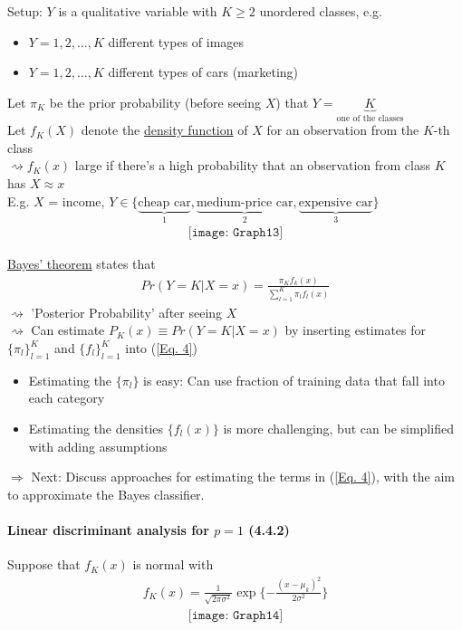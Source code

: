 \documentclass[11pt,a4paper,numbers=endperiod]{scrartcl}
\begin{document}
{Setup: $Y$ is a qualitative variable with $K \geq 2$ unordered classes, e.g. \begin{itemize}
	\item $Y = 1, 2, \ldots, K$ different types of images
	\item $Y = 1, 2, \ldots, K$ different types of cars (marketing) 
\end{itemize}
Let $\pi_K$ be the prior probability (before seeing $X$) that $Y = \underbrace{K}_{\text{one of the classes}}$\\
Let $f_K(X)$ denote the \underline{density function} of $X$ for an observation from the $K$-th class\\
$\rightsquigarrow f_K(x)$ large if there's a high probability that an observation from class $K$ has $X \approx x$\\ 
E.g. $X$ = income, $Y \in \{\underbrace{\text{cheap car}}_1, \underbrace{\text{medium-price car}}_2, \underbrace{\text{expensive car}}_3\}$
\begin{align*}
	\texttt{[image: Graph13]}
\end{align*}
	
\underline{Bayes' theorem} states that \begin{align}
	Pr(Y = K| X = x) = \frac{\pi_K f_k(x)}{\sum\limits_{l = 1}^K \pi_l f_l(x)}  \label{Eq. 4}
\end{align}	
$\rightsquigarrow$ 'Posterior Probability' after seeing $X$\\
$\rightsquigarrow$ Can estimate $P_K(x) \equiv Pr(Y = K|X = x)$ by inserting estimates for $\{\pi_l\}_{l = 1}^K$ and $\{f_l\}_{l = 1}^K$ into (\ref*{Eq. 4})
\begin{itemize}
	\item Estimating the $\{\pi_l\}$ is easy: Can use fraction of training data that fall into each category
	\item Estimating the densities $\{f_l(x)\}$ is more challenging, but can be simplified with adding assumptions
\end{itemize}
$\Rightarrow$ Next: Discuss approaches for estimating the terms in (\ref*{Eq. 4}), with the aim to approximate the Bayes classifier.\\
\newpage
\paragraph{Linear discriminant analysis for $p = 1$ (4.4.2)}
$ $\\

Suppose that $f_K(x)$ is normal with \begin{align*}
	f_K(x) = \frac{1}{\sqrt{2 \pi \sigma^2}} \exp\{- \frac{(x - \mu_k)^2}{2 \sigma^2}\}
\end{align*}	
\begin{align*}
	\texttt{[image: Graph14]}
\end{align*}

}
\end{document}
